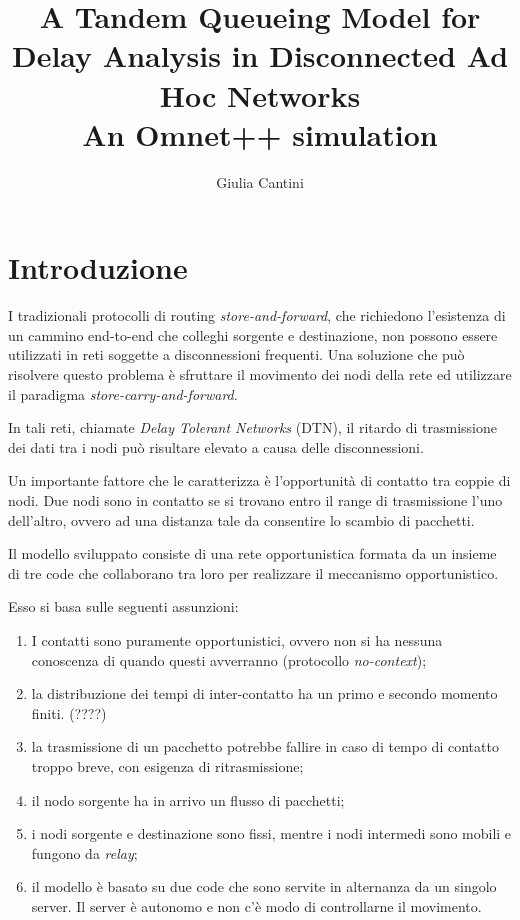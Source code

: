 \documentclass[a4paper,11pt]{article}
\begin{document}
\author{Giulia Cantini}
\title{A Tandem Queueing Model for Delay Analysis in Disconnected Ad Hoc Networks\\
\vspace{0.5cm}
\Large{An Omnet++ simulation}}
\maketitle
\date

\tableofcontents

\section{Introduzione}
I tradizionali protocolli di routing \textit{store-and-forward}, che richiedono l'esistenza di un cammino
end-to-end che colleghi sorgente e destinazione, non possono essere utilizzati in reti
soggette a disconnessioni frequenti. Una soluzione che può risolvere questo problema è
sfruttare il movimento dei nodi della rete ed utilizzare il paradigma \textit{store-carry-and-forward}.

In tali reti, chiamate \textit{Delay Tolerant Networks} (DTN), il ritardo di trasmissione dei dati tra i nodi
può risultare elevato a causa delle disconnessioni.

Un importante fattore che le caratterizza è l'opportunità di contatto tra coppie di nodi.
Due nodi sono in contatto se si trovano entro il range di trasmissione l'uno dell'altro,
ovvero ad una distanza tale da consentire lo scambio di pacchetti.

Il modello sviluppato consiste di una rete opportunistica formata da un insieme di tre code
che collaborano tra loro per realizzare il meccanismo opportunistico.

Esso si basa sulle seguenti assunzioni:

\begin{enumerate}
  \item I contatti sono puramente opportunistici, ovvero non si ha nessuna conoscenza
  di quando questi avverranno (protocollo \textit{no-context});
  \item la distribuzione dei tempi di inter-contatto ha un primo e secondo momento
  finiti. (????)
  \item la trasmissione di un pacchetto potrebbe fallire in caso di tempo di contatto
  troppo breve, con esigenza di ritrasmissione;
  \item il nodo sorgente ha in arrivo un flusso di pacchetti;
  \item i nodi sorgente e destinazione sono fissi, mentre i nodi intermedi sono mobili e
  fungono da \textit{relay};
  \item il modello è basato su due code che sono servite in alternanza da un singolo server.
  Il server è autonomo e non c'è modo di controllarne il movimento.

\end{enumerate}
\end{document}
